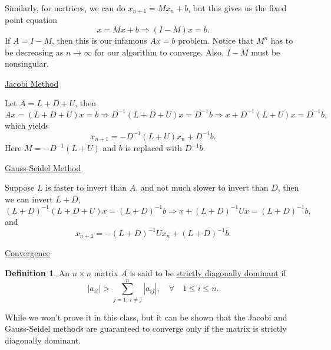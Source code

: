 \documentclass[reqno]{amsart}
\theoremstyle{definition}
\newtheorem{definition}{Definition}
\begin{document}
Similarly, for matrices, we can do $x_{n+1} = Mx_n + b$, but this gives us the fixed point equation
%
\begin{equation}
x = Mx + b \Rightarrow (I-M)x = b.
\end{equation}
%
If $A = I - M$, then this is our infamous $Ax = b$ problem.  Notice that $M^n$ has to be decreasing as $n \rightarrow \infty$ for our algorithm to converge.  Also, $I - M$ must be nonsingular.

\bigskip

\underline{\color{blue}Jacobi Method}

Let $A = L+D+U$, then
%
\begin{equation*}
Ax = (L+D+U)x = b \Rightarrow D^{-1}(L+D+U)x = D^{-1}b \Rightarrow x + D^{-1}(L+U)x = D^{-1}b,
\end{equation*}
%
which yields
%
\begin{equation}
x_{n+1} = -D^{-1}(L+U)x_n + D^{-1}b.
\end{equation}
%
Here $M = -D^{-1}(L+U)$ and $b$ is replaced with $D^{-1}b$.

\bigskip

\underline{\color{blue}Gauss-Seidel Method}

Suppose $L$ is faster to invert than $A$, and not much slower to invert than $D$, then we can invert $L+D$,
%
\begin{equation*}
(L+D)^{-1}(L+D+U)x = (L+D)^{-1}b \Rightarrow x + (L+D)^{-1}Ux = (L+D)^{-1}b,
\end{equation*}
%
and
%
\begin{equation}
x_{n+1} = -(L+D)^{-1}Ux_n + (L+D)^{-1}b.
\end{equation}

\bigskip

\underline{\color{blue}Convergence}

\begin{definition}
\color{red} An $n\times n$ matrix $A$ is said to be \underline{strictly diagonally dominant} if
%
\begin{equation}
|a_{ii}| > \sum_{j=1,\, i\neq j}^n |a_{ij}|,\quad \forall\quad 1\leq i\leq n.
\end{equation}
\end{definition}
%

While we won't prove it in this class, but it can be shown that the Jacobi and Gauss-Seidel methods are guaranteed to converge only if the matrix is strictly diagonally dominant.
\end{document}
